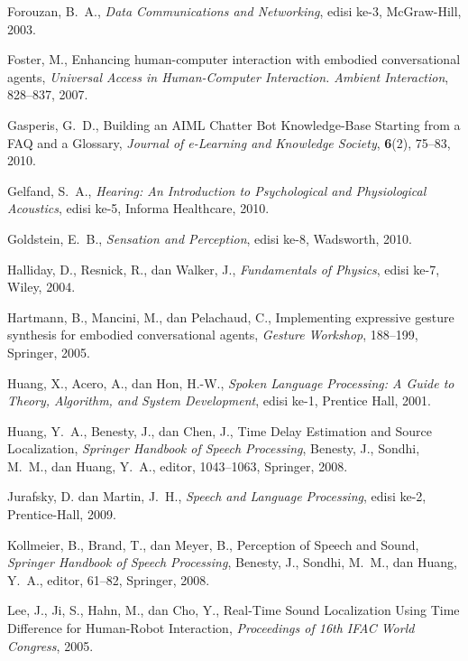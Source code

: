 \begin{thebibliography}{10}
Forouzan, B.~A.,
  {\em {Data Communications and Networking}\/}, edisi ke-3,
  McGraw-Hill, 2003.

Foster, M.,
  {Enhancing human-computer interaction with embodied conversational agents},
  {\em Universal Access in Human-Computer Interaction. Ambient Interaction\/},
  828--837, 2007.

Gasperis, G.~D.,
  {Building an AIML Chatter Bot Knowledge-Base Starting from a FAQ and a Glossary},
  {\em Journal of e-Learning and Knowledge Society\/}, \textbf{6}(2),
  75--83, 2010.

Gelfand, S.~A.,
  {\em {Hearing: An Introduction to Psychological and Physiological Acoustics}\/},
  edisi ke-5, Informa Healthcare, 2010.

Goldstein, E.~B.,
  {\em {Sensation and Perception}\/},
  edisi ke-8, Wadsworth, 2010.

Halliday, D., Resnick, R., dan Walker, J.,
  {\em {Fundamentals of Physics}\/},
  edisi ke-7, Wiley, 2004.

Hartmann, B., Mancini, M., dan Pelachaud, C.,
  Implementing expressive gesture synthesis for embodied conversational agents,
  {\em Gesture Workshop\/}, 188--199, Springer, 2005. 

Huang, X., Acero, A., dan Hon, H.-W.,
  {\em {Spoken Language Processing: A Guide to Theory, Algorithm, and System Development}\/},
  edisi ke-1, Prentice Hall, 2001.

Huang, Y.~A., Benesty, J., dan Chen, J.,
  {Time Delay Estimation and Source Localization},
  {\em {Springer Handbook of Speech Processing}\/},
  Benesty, J., Sondhi, M.~M., dan Huang, Y.~A., editor,
  1043--1063, Springer, 2008.

Jurafsky, D. dan Martin, J.~H.,
  {\em {Speech and Language Processing}\/},
  edisi ke-2, Prentice-Hall, 2009.

Kollmeier, B., Brand, T., dan Meyer, B.,
  {Perception of Speech and Sound},
  {\em {Springer Handbook of Speech Processing}\/},
  Benesty, J., Sondhi, M.~M., dan Huang, Y.~A., editor, 
  61--82, Springer, 2008.

Lee, J., Ji, S., Hahn, M., dan Cho, Y.,
  {Real-Time Sound Localization Using Time Difference for Human-Robot Interaction},
  {\em Proceedings of 16th IFAC World Congress\/}, 2005.


\end{thebibliography}
